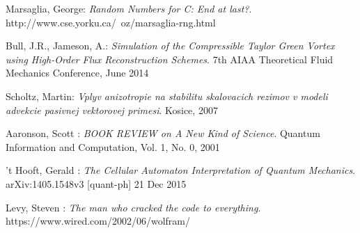 \documentclass[12pt,a4paper,fleqn]{report}
\let\openright=\clearpage
\begin{document}
\begin{thebibliography}{99}
   {\sc Marsaglia,} George:
   \emph{ Random Numbers for C: End at last?}.
   http://www.cse.yorku.ca/~oz/marsaglia-rng.html


   {\sc Bull,} J.R., {\sc Jameson,} A.:
   \emph{ Simulation of the Compressible Taylor Green Vortex using High-Order Flux Reconstruction Schemes}.
      7th AIAA Theoretical Fluid Mechanics Conference, June 2014


   {\sc Scholtz,} Martin:
   \emph{ Vplyv anizotropie na stabilitu skalovacich rezimov v modeli advekcie pasivnej vektorovej primesi}.
   Kosice, 2007
   

   {\sc Aaronson,} Scott :
   \emph{ BOOK REVIEW on A New Kind of Science}.
	Quantum Information and Computation, Vol. 1, No. 0, 2001


   {\sc 't Hooft,} Gerald :
   \emph{ The Cellular Automaton Interpretation of Quantum Mechanics}.
	arXiv:1405.1548v3 [quant-ph] 21 Dec 2015

   {\sc Levy,} Steven :
   \emph{ The man who cracked the code to everything}.
	https://www.wired.com/2002/06/wolfram/



\end{thebibliography}

\listoffigures

\listoftables


%

\openright
\end{document}
